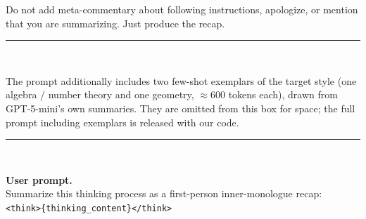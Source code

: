 \begin{tcolorbox}[breakable, pad at break*=1mm, title=Reasoning Summary Compression Prompt]
Do not add meta-commentary about following instructions, apologize, or mention that you are summarizing. Just produce the recap.\\

\vspace{-10pt}
\rule{\linewidth}{0.3pt}\\
\vspace{-10pt}

The prompt additionally includes two few-shot exemplars of the target style (one algebra / number theory and one geometry, $\approx$600 tokens each), drawn from GPT-5-mini's own summaries. They are omitted from this box for space; the full prompt including exemplars is released with our code.\\

\vspace{-10pt}
\rule{\linewidth}{0.3pt}\\
\vspace{-10pt}

\textbf{User prompt.}\\
Summarize this thinking process as a first-person inner-monologue recap:\\
\texttt{<think>\{thinking\_content\}</think>}

\end{tcolorbox}


